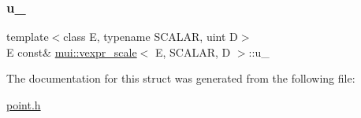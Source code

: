 \subsubsection{\texorpdfstring{u\+\_\+}{u\_}}
{\footnotesize\ttfamily template$<$class E, typename S\+C\+A\+L\+AR, uint D$>$ \\
E const\& \hyperlink{structmui_1_1vexpr__scale}{mui\+::vexpr\+\_\+scale}$<$ E, S\+C\+A\+L\+AR, D $>$\+::u\+\_\+\hspace{0.3cm}{\ttfamily [protected]}}



The documentation for this struct was generated from the following file\+:\begin{DoxyCompactItemize}
\item 
\hyperlink{point_8h}{point.\+h}\end{DoxyCompactItemize}
